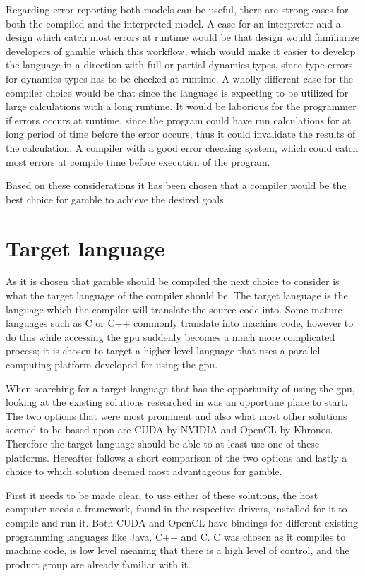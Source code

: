 Regarding error reporting both models can be useful, there are strong cases for both the compiled and the interpreted model.
A case for an interpreter and a design which catch most errors at runtime would be that design would familiarize developers of \gls{gamble} which this workflow, which would make it easier to develop the language in a direction with full or partial dynamics types, since type errors for dynamics types has to be checked at runtime.
A wholly different case for the compiler choice would be that since the language is expecting to be utilized for large calculations with a long runtime.
It would be laborious for the programmer if errors occurs at runtime, since the program could have run calculations for at long period of time before the error occurs, thus it could invalidate the results of the calculation.
A compiler with a good error checking system, which could catch most errors at compile time before execution of the program. \citep{Sebesta, Crafting_book}

Based on these considerations it has been chosen that a compiler would be the best choice for \gls{gamble} to achieve the desired goals.

\section{Target language}\label{CUDAvsOpenCL}
As it is chosen that \gls{gamble} should be compiled the next choice to consider is what the target language of the compiler should be.
The target language is the language which the compiler will translate the source code into.
Some mature languages such as C or C++ commonly translate into machine code, however to do this while accessing the \acrshort{gpu} suddenly becomes a much more complicated process; it is chosen to target a higher level language that uses a parallel computing platform developed for using the \acrshort{gpu}.

When searching for a target language that has the opportunity of using the \acrshort{gpu}, looking at the existing solutions researched in  was an opportune place to start.
The two options that were most prominent and also what most other solutions seemed to be based upon are CUDA by NVIDIA and OpenCL by Khronos.
Therefore the target language should be able to at least use one of these platforms.
Hereafter follows a short comparison of the two options and lastly a choice to which solution deemed most advantageous for \gls{gamble}.

First it needs to be made clear, to use either of these solutions, the host computer needs a framework, found in the respective drivers, installed for it to compile and run it. 
Both CUDA and OpenCL have bindings for different existing programming languages like Java, C++ and C.
C was chosen as it compiles to machine code, is low level meaning that there is a high level of control, and the product group are already familiar with it. 

